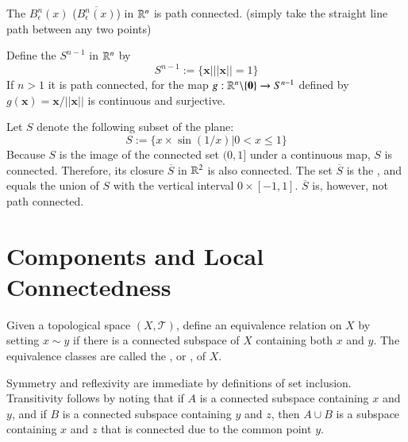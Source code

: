 \begin{example}
    The  $B^n_{\epsilon}(x)$ ($\overline{B^n_{\epsilon}(x)}$) in $\mathbb R^n$ is path connected. (simply take the straight line path between any two points)
\end{example}

\begin{example}
    Define the  $S^{n-1}$ in $\mathbb R^n$ by \begin{equation*}
        S^{n-1} := \{\mathbf{x}\vert||\mathbf{x}|| = 1\}
    \end{equation*}
    If $n >1$ it is path connected, for the map $g:\mathbb R^n\backslash\{\mathbf{0}\}\rightarrow S^{n-1}$ defined by $g(\mathbf{x}) = \mathbf{x}/||\mathbf{x}||$ is continuous and surjective.
\end{example}

\begin{example}
    Let $S$ denote the following subset of the plane: \begin{equation*}
        S := \{x\times \sin(1/x) \vert 0 < x \leq 1\}
    \end{equation*}
    Because $S$ is the image of the connected set $(0,1]$ under a continuous map, $S$ is connected. Therefore, its closure $\overline{S}$ in $\mathbb R^2$ is also connected. The set $\overline{S}$ is the , and equals the union of $S$ with the vertical interval $0\times [-1,1]$. $\overline{S}$ is, however, not path connected.
\end{example}




\section{Components and Local Connectedness}

\begin{definition}
    Given a topological space $(X,\mathcal{T})$, define an equivalence relation on $X$ by setting $x \sim y$ if there is a connected subspace of $X$ containing both $x$ and $y$. The equivalence classes are called the , or , of $X$.
\end{definition}

Symmetry and reflexivity are immediate by definitions of set inclusion. Transitivity follows by noting that if $A$ is a connected subspace containing $x$ and $y$, and if $B$ is a connected subspace containing $y$ and $z$, then $A\cup B$ is a subspace containing $x$ and $z$ that is connected due to the common point $y$.

